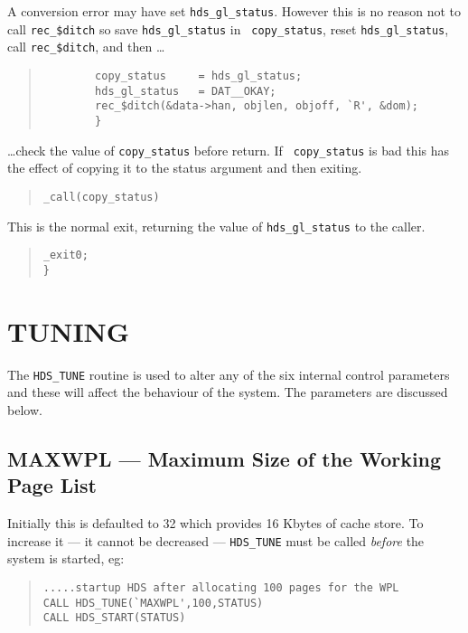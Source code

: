 A conversion error may have set {\tt hds\_gl\_status}. However this is no
reason not to call {\tt rec\_\$ditch} so save {\tt hds\_gl\_status} in {\tt
copy\_status}, reset {\tt hds\_gl\_status}, call {\tt rec\_\$ditch}, and then
\ldots 

\begin {quote}
\begin {verbatim}
        copy_status     = hds_gl_status;
        hds_gl_status   = DAT__OKAY;
        rec_$ditch(&data->han, objlen, objoff, `R', &dom);
        }
\end{verbatim}
\end {quote}
\ldots check the value of {\tt copy\_status} before return. If {\tt
copy\_status} is bad this has the effect of copying it to the status argument
and then exiting.

\begin {quote}
\begin {verbatim}
_call(copy_status)
\end{verbatim}
\end {quote}

This is the normal exit, returning the value of {\tt hds\_gl\_status} to the
caller. 

\begin {quote}
\begin {verbatim}
_exit0;
}
\end{verbatim}
\end {quote}

\section {TUNING}
\label {system_tuning}

The {\tt HDS\_TUNE} routine is used to alter any of the six internal control
parameters and these will affect the behaviour of the system. The parameters
are discussed below. 

\subsection {MAXWPL --- Maximum Size of the Working Page List}

Initially this is defaulted to 32 which provides 16 Kbytes of cache store. To
increase it --- it cannot be decreased --- {\tt HDS\_TUNE} must be called {\em
before} the system is started, eg: 

\begin {quote}
\begin {verbatim}
.....startup HDS after allocating 100 pages for the WPL
CALL HDS_TUNE(`MAXWPL',100,STATUS)
CALL HDS_START(STATUS)
\end{verbatim}
\end {quote}


